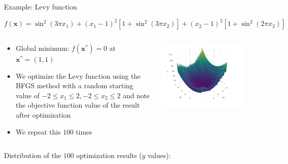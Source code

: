 \documentclass[11pt,compress,t,notes=noshow, xcolor=table]{beamer}
\begin{document}
\begin{vbframe}{Example: Levy function}


\footnotesize
$$
f(\bm{x}) = \sin^2(3\pi x_1) + (x_1 - 1)^2 [1 + \sin^2(3\pi x_2)] + (x_2 -1)^2
[1 + \sin^2(2\pi x_2)]
$$
\begin{columns}
\begin{column}{0.5\textwidth}
   \footnotesize
  \vspace{-0.2cm}
  \begin{itemize}
    \item Global minimum: $f(\bm{x}^*) = 0$ at $\bm{x}^* = (1,1)$
    \item We optimize the Levy function using the BFGS method with a random starting value of $-2\leq x_1 \leq 2, -2\leq     x_2 \leq 2$ and note the objective function value of the result after optimization
    \item We repeat this $100$ times
    \end{itemize}
\end{column}
\begin{column}{0.5\textwidth}  %
    \begin{center}
  \includegraphics[width = 0.9\textwidth]{figure_man/levy.png}
  \end{center}
\end{column}
\end{columns}





Distribution of the $100$ optimization results ($y$ values):
\vspace{0.1cm}


\end{vbframe}
\end{document}
